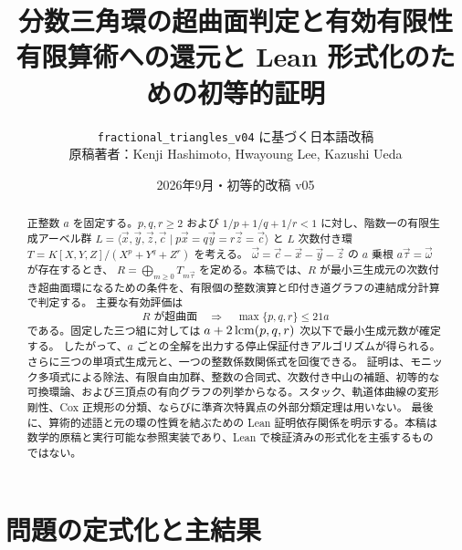 \documentclass[11pt,a4paper]{ltjsarticle}
\title{分数三角環の超曲面判定と有効有限性\\[3pt]\large 有限算術への還元と Lean 形式化のための初等的証明}
\author{\normalsize \texttt{fractional\_triangles\_v04} に基づく日本語改稿\\\small 原稿著者：Kenji Hashimoto, Hwayoung Lee, Kazushi Ueda}
\date{2026年9月・初等的改稿 v05}
\numberwithin{equation}{section}
\theoremstyle{definition}
\newcommand{\xx}{\vec x}\newcommand{\yy}{\vec y}\newcommand{\zz}{\vec z}\newcommand{\cc}{\vec c}\newcommand{\ww}{\vec\omega}\newcommand{\ttau}{\vec\tau}
\begin{document}
\maketitle
\begin{abstract}
正整数 $a$ を固定する。$p,q,r\ge2$ および $1/p+1/q+1/r<1$ に対し、階数一の有限生成アーベル群
$L=\langle\xx,\yy,\zz,\cc\mid p\xx=q\yy=r\zz=\cc\rangle$ と
$L$ 次数付き環 $T=K[X,Y,Z]/(X^p+Y^q+Z^r)$ を考える。
$\ww=\cc-\xx-\yy-\zz$ の $a$ 乗根 $a\ttau=\ww$ が存在するとき、
$R=\bigoplus_{m\ge0}T_{m\ttau}$ を定める。本稿では、$R$ が最小三生成元の次数付き超曲面環になるための条件を、有限個の整数演算と印付き道グラフの連結成分計算で判定する。
主要な有効評価は
\[
 R\text{ が超曲面}\quad\Longrightarrow\quad
 \max\{p,q,r\}\le21a
\]
である。固定した三つ組に対しては $a+2\operatorname{lcm}(p,q,r)$ 次以下で最小生成元数が確定する。
したがって、$a$ ごとの全解を出力する停止保証付きアルゴリズムが得られる。さらに三つの単項式生成元と、一つの整数係数関係式を回復できる。
証明は、モニック多項式による除法、有限自由加群、整数の合同式、次数付き中山の補題、初等的な可換環論、および三頂点の有向グラフの列挙からなる。スタック、軌道体曲線の変形剛性、Cox 正規形の分類、ならびに準斉次特異点の外部分類定理は用いない。
最後に、算術的述語と元の環の性質を結ぶための Lean 証明依存関係を明示する。本稿は数学的原稿と実行可能な参照実装であり、Lean で検証済みの形式化を主張するものではない。
\end{abstract}
\tableofcontents

\section{問題の定式化と主結果}
\end{document}
